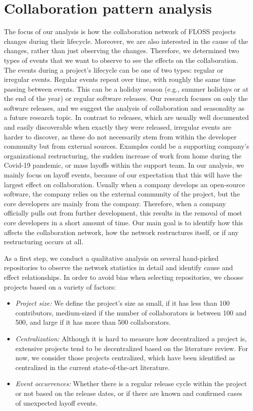 \section{Collaboration pattern analysis}
\label{sec:patterns}
The focus of our analysis is how the collaboration network of FLOSS projects changes during their lifecycle. Moreover, we are also interested in the cause of the changes, rather than just observing the changes. Therefore, we determined two types of events that we want to observe to see the effects on the collaboration. The events during a project's lifecycle can be one of two types: regular or irregular events. Regular events repeat over time, with roughly the same time passing between events. This can be a holiday season (e.g., summer holidays or at the end of the year) or regular software releases. Our research focuses on only the software releases, and we suggest the analysis of collaboration and seasonality as a future research topic. In contrast to releases, which are usually well documented and easily discoverable when exactly they were released, irregular events are harder to discover, as these do not necessarily stem from within the developer community but from external sources. Examples could be a supporting company's organizational restructuring, the sudden increase of work from home during the Covid-19 pandemic, or mass layoffs within the support team. In our analysis, we mainly focus on layoff events, because of our expectation that this will have the largest effect on collaboration. Usually when a company develops an open-source software, the company relies on the external community of the project, but the core developers are mainly from the company. Therefore, when a company officially pulls out from further development, this results in the removal of most core developers in a short amount of time. Our main goal is to identify how this affects the collaboration network, how the network restructures itself, or if any restructuring occurs at all. %

As a first step, we conduct a qualitative analysis on several hand-picked repositories to observe the network statistics in detail and identify cause and effect relationships. In order to avoid bias when selecting repositories, we choose projects based on a variety of factors:

\begin{itemize}
    \item \textit{Project size:} We define the project's size as small, if it has less than 100 contributors, medium-sized if the number of collaborators is between 100 and 500, and large if it has more than 500 collaborators.
    \item \textit{Centralization:} Although it is hard to measure how decentralized a project is, extensive projects tend to be decentralized based on the literature review. For now, we consider those projects centralized, which have been identified as centralized in the current state-of-the-art literature. 
    \item \textit{Event occurrences:} Whether there is a regular release cycle within the project or not based on the release dates, or if there are known and confirmed cases of unexpected layoff events.
\end{itemize}

